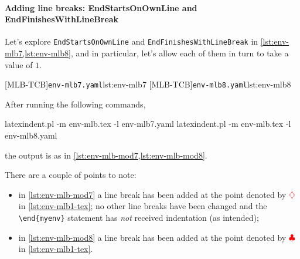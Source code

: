 \paragraph{Adding line breaks: EndStartsOnOwnLine and EndFinishesWithLineBreak}
  \begin{example}
  Let's explore \texttt{EndStartsOnOwnLine} and \texttt{EndFinishesWithLineBreak} in
  \cref{lst:env-mlb7,lst:env-mlb8}, and in particular, let's allow each of them in turn to
  take a value of $1$. 

  \begin{cmhtcbraster}
   [MLB-TCB]{\texttt{env-mlb7.yaml}}{lst:env-mlb7}
   [MLB-TCB]{\texttt{env-mlb8.yaml}}{lst:env-mlb8}
  \end{cmhtcbraster}

  After running the following commands, 

  \begin{commandshell}
latexindent.pl -m env-mlb.tex -l env-mlb7.yaml
latexindent.pl -m env-mlb.tex -l env-mlb8.yaml
\end{commandshell}

  the output is as in \cref{lst:env-mlb-mod7,lst:env-mlb-mod8}.

  \begin{cmhtcbraster}[raster columns=3,
    raster left skip=-3.5cm,
    raster right skip=-2cm,
    raster column skip=.06\linewidth]
  \end{cmhtcbraster}

  There are a couple of points to note:
  \begin{itemize}
   \item in \cref{lst:env-mlb-mod7} a line break has been added at the point denoted by
         $\color{red}\diamondsuit$ in \vref{lst:env-mlb1-tex}; no other line breaks have been changed
         and the \lstinline!\end{myenv}! statement has \emph{not} received indentation (as
         intended);
   \item in \cref{lst:env-mlb-mod8} a line break has been added at the point denoted by
         $\color{red}\clubsuit$ in \vref{lst:env-mlb1-tex}.
  \end{itemize}
  \end{example}

